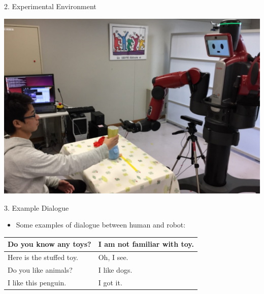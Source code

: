 \documentclass[final,hyperref={pdfpagelabels=false}]{beamer}
\begin{document}
\begin{frame}[t]
\begin{columns}[t]
\begin{column}{.43\textwidth}
    \begin{block}{2. Experimental Environment}
      \begin{center}
        \includegraphics[width=0.9\columnwidth]{./fig/experimental_env.pdf}
      \end{center}
    \end{block}

    \begin{block}{3. Example Dialogue}
      \begin{itemize}
        \item Some examples of dialogue between human and robot:
      \end{itemize}

    \begin{table}
        \label{tab:dialogue}
        \begin{tabular}{|l||l|}
        \hline
           Do you know any toys? & I am not familiar with toy.  \\
        \hline
           Here is the stuffed toy. & Oh, I see.  \\
        \hline
           Do you like animals? & I like dogs.  \\
        \hline
           I like this penguin. & I got it. \\
        \hline
        \end{tabular}
    \end{table}

    \end{block}


\end{column}
\end{columns}
\end{frame}
\end{document}
